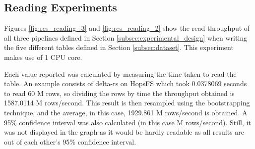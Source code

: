 \subsection{Reading Experiments}

Figures \ref{fig:res_reading_3} and \ref{fig:res_reading_2} show the read throughput of all three pipelines defined in Section \ref{subsec:experimental_design} when writing the five different tables defined in Section \ref{subsec:dataset}. This experiment makes use of 1 \gls{CPU} core. 

Each value reported was calculated by measuring the time taken to read the table. An example consists of delta-rs on \gls{HopsFS} which took 0.0378069 seconds to read 60 M rows, so dividing the rows by time the throughput obtained is 1587.0114 M rows/second. This result is then resampled using the bootstrapping technique, and the average, in this case, 1929.861 M rows/second is obtained. A 95\% confidence interval was also calculated (in this case  M rows/second). Still, it was not displayed in the graph as it would be hardly readable as all results are out of each other's 95\% confidence interval.

